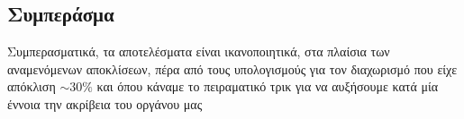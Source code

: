 \documentclass[a4paper]{article}
\begin{document}

\subsection*{Συμπεράσμα}
	Συμπερασματικά, τα αποτελέσματα είναι ικανοποιητικά, στα πλαίσια των αναμενόμενων αποκλίσεων, πέρα από τους υπολογισμούς για τον διαχωρισμό που είχε απόκλιση $\sim 30\% $ και όπου κάναμε το πειραματικό τρικ για να αυξήσουμε κατά μία έννοια την ακρίβεια του οργάνου μας
\end{document}
